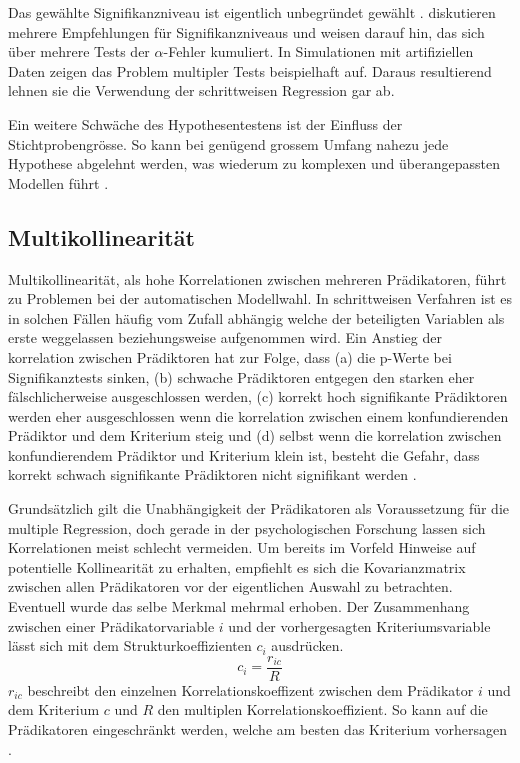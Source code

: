 \documentclass[english,12pt,doc]{apa}
\begin{document}
Das gewählte Signifikanzniveau ist eigentlich unbegründet gewählt \cite[p. 174]{weakliem2004introduction}.  diskutieren mehrere Empfehlungen für Signifikanzniveaus und weisen darauf hin, das sich über mehrere Tests der $\alpha$-Fehler kumuliert. 
In  Simulationen mit artifiziellen Daten zeigen  das  Problem multipler Tests beispielhaft auf. 
Daraus resultierend lehnen sie die Verwendung der schrittweisen Regression gar ab.

Ein weitere Schwäche des Hypothesentestens ist der Einfluss der Stichtprobengrösse. So kann bei genügend grossem Umfang nahezu jede Hypothese abgelehnt werden, was wiederum zu komplexen und überangepassten Modellen führt \cite[p.173]{weakliem2004introduction}.

\subsection{Multikollinearität}
Multikollinearität, als hohe Korrelationen zwischen mehreren Prädikatoren, führt zu Problemen bei der automatischen Modellwahl. 
In schrittweisen Verfahren ist es in solchen Fällen häufig vom Zufall abhängig welche der beteiligten Variablen als erste weggelassen beziehungsweise aufgenommen wird. 
Ein Anstieg der  korrelation zwischen Prädiktoren hat zur Folge, dass (a) die p-Werte bei Signifikanztests sinken, (b) schwache Prädiktoren entgegen den starken eher fälschlicherweise ausgeschlossen werden, (c) korrekt hoch signifikante Prädiktoren werden eher ausgeschlossen wenn die korrelation zwischen einem konfundierenden Prädiktor und dem Kriterium steig und (d) selbst wenn die korrelation zwischen konfundierendem Prädiktor und Kriterium klein ist, besteht die Gefahr, dass korrekt schwach signifikante Prädiktoren nicht signifikant werden \cite[p. 2810]{graham2003confronting}.

Grundsätzlich gilt die Unabhängigkeit der Prädikatoren als Voraussetzung für die multiple Regression, doch gerade in der psychologischen Forschung lassen sich Korrelationen meist schlecht vermeiden.
Um bereits im Vorfeld Hinweise auf potentielle Kollinearität zu erhalten, empfiehlt es sich die Kovarianzmatrix zwischen allen Prädikatoren vor der eigentlichen Auswahl zu betrachten.
Eventuell wurde das selbe Merkmal mehrmal erhoben.
Der Zusammenhang zwischen einer Prädikatorvariable $i$ und der vorhergesagten Kriteriumsvariable lässt sich mit dem Strukturkoeffizienten $c_i$ ausdrücken.
\begin{equation}
c_i = \frac{r_{ic}}{R}
\tag{Strukturkoeffizient}
\end{equation}
$r_{ic}$ beschreibt den einzelnen Korrelationskoeffizent zwischen dem Prädikator $i$ und dem Kriterium $c$ und $R$ den multiplen Korrelationskoeffizient. 
So kann auf die Prädikatoren eingeschränkt werden,  welche am besten das Kriterium vorhersagen \cite[S. 453]{bortz2011}. 
\end{document}
